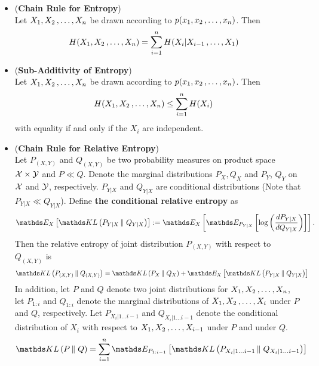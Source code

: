 \documentclass[11pt]{article}
\begin{document}
\begin{itemize}
\item \begin{proposition} (\textbf{Chain Rule for Entropy}) \citep{thomas2006elements}\\
Let $X_1, X_2 \,{,}\ldots{,}\, X_n$ be drawn according to $p(x_1, x_2 \,{,}\ldots{,}\, x_n)$. Then
\begin{align}
H(X_1, X_2 \,{,}\ldots{,}\, X_n) &= \sum_{i=1}^{n}H(X_i | X_{i-1} \,{,}\ldots{,}\, X_1) \label{eqn: chain_rule_entropy}
\end{align}
\end{proposition}

\item \begin{proposition} (\textbf{Sub-Additivity of Entropy}) \citep{thomas2006elements}\\
Let $X_1, X_2 \,{,}\ldots{,}\, X_n$ be drawn according to $p(x_1, x_2 \,{,}\ldots{,}\, x_n)$. Then
\begin{align}
H(X_1, X_2 \,{,}\ldots{,}\, X_n) &\le \sum_{i=1}^{n}H(X_i)  \label{ineqn: sub_additivity_entropy}
\end{align} with equality if and only if the $X_i$ are independent.
\end{proposition}


\item \begin{proposition} (\textbf{Chain Rule for Relative Entropy}) \citep{thomas2006elements}\\
Let $P_{(X, Y)}$ and $Q_{(X, Y)}$ be two probability measures on product space ${\mathcal X} \times {\mathcal Y}$ and $P \ll Q$. Denote the marginal distributions $P_X, Q_X$ and $P_Y$, $Q_Y$ on ${\mathcal X}$ and ${\mathcal Y}$, respectively. $P_{Y|X}$ and $Q_{Y|X}$ are conditional distributions (Note that $P_{Y|X} \ll Q_{Y|X}$).  Define \textbf{the conditional relative entropy} as
\begin{align*}
\E{X}{\kl{P_{Y | X}}{Q_{Y | X}}} := \E{X}{\E{P_{Y|X}}{\log \paren{\frac{dP_{Y| X}}{dQ_{Y | X}}}}}. 
\end{align*} Then the relative entropy of joint distribution $P_{(X, Y)}$ with respect to $Q_{(X, Y)}$ is 
\begin{align}
\kl{P_{(X, Y)}}{Q_{(X, Y)}} &= \kl{P_{X}}{Q_{X}} + \E{X}{\kl{P_{Y | X}}{Q_{Y | X}}} \label{eqn: chain_rule_kl}
\end{align} In addition, let $P$ and $Q$ denote two joint distributions for $X_1, X_2 \,{,}\ldots{,}\, X_n$, let $P_{1:i}$ and $Q_{1:i}$ denote the marginal distributions of $X_1, X_2 \,{,}\ldots{,}\, X_i$ under $P$ and $Q$, respectively. Let $P_{X_i | 1 \ldots i-1}$ and $Q_{X_i | 1 \ldots i-1}$ denote the conditional distribution of $X_i$ with respect to $X_1, X_2 \,{,}\ldots{,}\, X_{i-1}$ under $P$ and under $Q$.
\begin{align}
\kl{P}{Q} &= \sum_{i=1}^{n}\E{P_{1:i-1}}{\kl{P_{X_i | 1 \ldots i-1}}{Q_{X_i | 1 \ldots i-1}}} \label{eqn: chain_rule_kl_k}
\end{align} 
\end{proposition}


\end{itemize}
\end{document}
